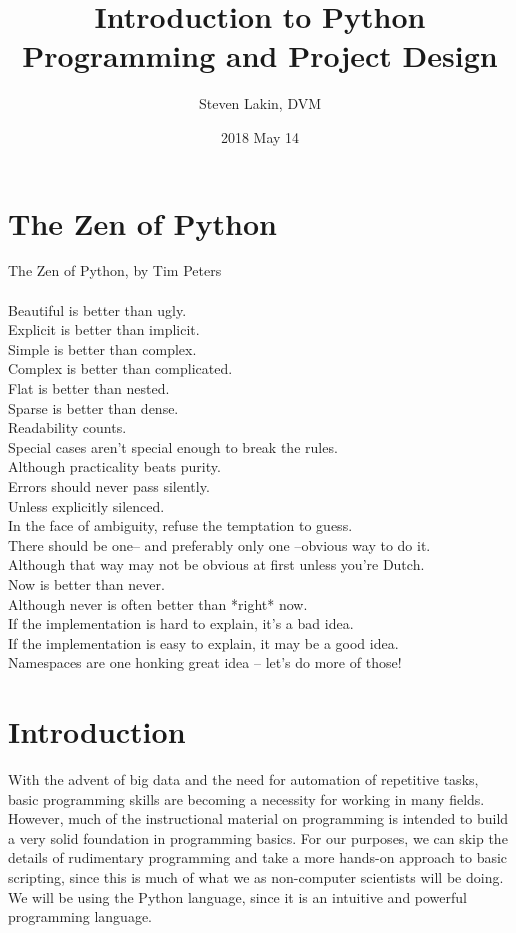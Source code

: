 \documentclass[a4paper,11pt]{article}
\title{Introduction to Python Programming and Project Design}
\author{Steven Lakin, DVM}
\date{2018 May 14}
\begin{document}
\maketitle

\pagebreak

\tableofcontents


\pagebreak

\section{The Zen of Python}
The Zen of Python, by Tim Peters \\
\\
Beautiful is better than ugly. \\
Explicit is better than implicit. \\
Simple is better than complex. \\
Complex is better than complicated. \\
Flat is better than nested. \\
Sparse is better than dense. \\
Readability counts. \\
Special cases aren't special enough to break the rules. \\
Although practicality beats purity. \\
Errors should never pass silently. \\
Unless explicitly silenced. \\
In the face of ambiguity, refuse the temptation to guess. \\
There should be one-- and preferably only one --obvious way to do it. \\
Although that way may not be obvious at first unless you're Dutch. \\
Now is better than never. \\
Although never is often better than *right* now. \\
If the implementation is hard to explain, it's a bad idea. \\
If the implementation is easy to explain, it may be a good idea. \\
Namespaces are one honking great idea -- let's do more of those!

\pagebreak

\section{Introduction}
\par
With the advent of big data and the need for automation of repetitive tasks, basic programming
skills are becoming a necessity for working in many fields. However, much of the instructional
material on programming is intended to build a very solid foundation in programming basics. For our
purposes, we can skip the details of rudimentary programming and take a more hands-on approach to
basic scripting, since this is much of what we as non-computer scientists will be doing. We will be
using the Python language, since it is an intuitive and powerful programming language. \par
\end{document}
